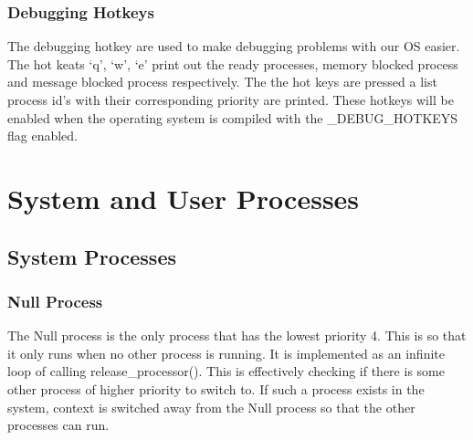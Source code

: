 \documentclass[12pt]{article}
\begin{document}
\subsubsection{Debugging Hotkeys}
The debugging hotkey are used to make debugging problems with our OS easier. The hot keats ‘q’, ‘w’, ‘e’ print out the ready processes, memory blocked process and message blocked process respectively. The the hot keys are pressed a list process id’s with their corresponding priority are printed. These hotkeys will be enabled when the operating system is compiled with the \_DEBUG\_HOTKEYS flag enabled.

\section{System and User Processes}
\subsection{System Processes}
\subsubsection{Null Process}
The Null process is the only process that has the lowest priority 4. This is so that it only runs when no other process is running. It is implemented as an infinite loop of calling release\_processor(). This is effectively checking if there is some other process of higher priority to switch to. If such a process exists in the system, context is switched away from the Null process so that the other processes can run.
\end{document}
